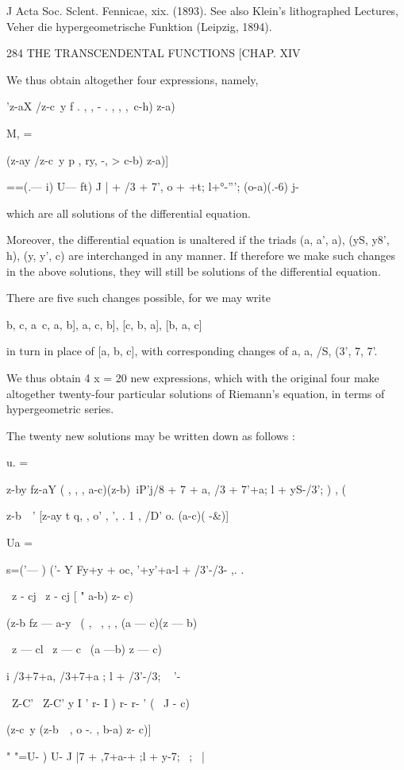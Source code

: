 J Acta Soc. Sclent. Fennicae, xix. (1893). See also Klein's
lithographed Lectures, Veher die hypergeometrische Funktion (Leipzig,
1894).

284 THE TRANSCENDENTAL FUNCTIONS [CHAP. XIV

We thus obtain altogether four expressions, namely,

'z-aX /z-c\ y f . , , - . , , ,\ c-h) z-a)\

M, =

(z-ay /z-c\ y p , ry, -, > c-b) z-a)]

 ==(.— i) U— ft) J | + /3 + 7', o + +t; l+°-'''; (o-a)(.-6) j-

which are all solutions of the differential equation.

Moreover, the differential equation is unaltered if the triads (a, a',
a), (yS, y8', h), (y, y', c) are interchanged in any manner. If
therefore we make such changes in the above solutions, they will still
be solutions of the differential equation.

There are five such changes possible, for we may write

 b, c, a\, c, a, b], a, c, b], [c, b, a], [b, a, c]

in turn in place of [a, b, c], with corresponding changes of a, a, /S,
(3', 7, 7'.

We thus obtain 4 x = 20 new expressions, which with the original four
make altogether twenty-four particular solutions of Riemann's
equation, in terms of hypergeometric series.

The twenty new solutions may be written down as follows :

u. =

z-by fz-aY ( , , , a-c)(z-b)\ iP'j/8 + 7 + a, /3 + 7'+a; l + yS-/3'; )
, (

z-b\ \ ' [z-ay t q, , o' , ', . 1 , /D' o. (a-c)( -\&)]

Ua =

 s=('— ) ('- Y Fy+y + oc, '+y'+a-l + /3'-/3- ,. .

\ z - cj \ z - cj [ " a-b) z- c)

(z-b fz — a-y \ ( , \ , , , (a — c)(z — b)

\ z — cl \ z — c \ (a —b) z — c)

i /3+7+a, /3+7+a ; l + /3'-/3; ~ '-\

\ Z-C' \ Z-C' y I ' r- I ) r- r- ' ( \ J - c)\

(z-c\ y (z-b\ \ , o -. , b-a) z- c)]

" "=U- ) U- J |7 + ,7+a-+ ;l + y-7; \ ; \ |

